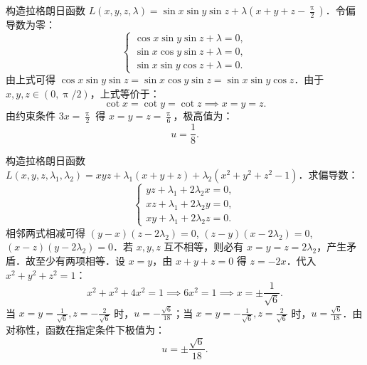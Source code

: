 \begin{solution}
    构造拉格朗日函数 $L(x, y, z, \lambda) = \sin x \sin y \sin z + \lambda \left( x + y + z - \frac{\uppi}{2} \right)$．令偏导数为零：
    \begin{equation}
        \begin{cases}
            \cos x \sin y \sin z + \lambda = 0, \\
            \sin x \cos y \sin z + \lambda = 0, \\
            \sin x \sin y \cos z + \lambda = 0.
        \end{cases}
    \end{equation}
    由上式可得 $\cos x \sin y \sin z = \sin x \cos y \sin z = \sin x \sin y \cos z$．由于 $x, y, z \in (0, \uppi/2)$，上式等价于：
    \begin{equation}
        \cot x = \cot y = \cot z \implies x = y = z.
    \end{equation}
    由约束条件 $3x = \frac{\uppi}{2}$ 得 $x = y = z = \frac{\uppi}{6}$，极高值为：
    \begin{equation}
        \boxed{u = \frac{1}{8}}.
    \end{equation}


    构造拉格朗日函数 $L(x, y, z, \lambda_1, \lambda_2) = x y z + \lambda_{1}(x + y + z) + \lambda_{2}(x^{2} + y^{2} + z^{2} - 1)$．求偏导数：
    \begin{equation}
        \begin{cases}
            y z + \lambda_{1} + 2 \lambda_{2} x = 0, \\
            x z + \lambda_{1} + 2 \lambda_{2} y = 0, \\
            x y + \lambda_{1} + 2 \lambda_{2} z = 0.
        \end{cases}
    \end{equation}
    相邻两式相减可得 $(y - x)(z - 2 \lambda_{2}) = 0$, $(z - y)(x - 2 \lambda_{2}) = 0$, $(x - z)(y - 2 \lambda_{2}) = 0$．若 $x, y, z$ 互不相等，则必有 $x = y = z = 2 \lambda_{2}$，产生矛盾．故至少有两项相等．设 $x = y$，由 $x + y + z = 0$ 得 $z = -2x$．代入 $x^{2} + y^{2} + z^{2} = 1$：
    \begin{equation}
        x^{2} + x^{2} + 4x^{2} = 1 \implies 6x^{2} = 1 \implies x = \pm \frac{1}{\sqrt{6}}.
    \end{equation}
    当 $x = y = \frac{1}{\sqrt{6}}, z = -\frac{2}{\sqrt{6}}$ 时，$u = -\frac{\sqrt{6}}{18}$；当 $x = y = -\frac{1}{\sqrt{6}}, z = \frac{2}{\sqrt{6}}$ 时，$u = \frac{\sqrt{6}}{18}$．由对称性，函数在指定条件下极值为：
    \begin{equation}
        \boxed{u = \pm \frac{\sqrt{6}}{18}}.
    \end{equation}
\end{solution}


